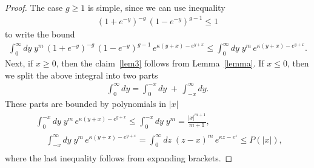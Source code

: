 \documentclass[11pt]{article}
\numberwithin{equation}{section}
\theoremstyle{plain}
\theoremstyle{definition}
\begin{document}
\begin{proof}
	The case $g \geq 1$ is simple, since we can use inequality
	\begin{align}
		(1 + e^{-y})^{- g} \, (1 - e^{-y})^{g - 1} \leq 1
	\end{align}
	to write the bound
	\begin{align}
		\int_{0}^\infty dy \; y^m  \, (1 + e^{-y})^{- g} \, (1 - e^{-y})^{g - 1} \, e^{\kappa (y + x) - e^{y + x}} \leq \int_{0}^\infty dy \; y^m  \,  e^{\kappa (y + x) - e^{y + x}}.
	\end{align}
	Next, if $x \geq 0$, then the claim~\eqref{lem3} follows from Lemma~\ref{lemma}. If $x \leq 0$, then we split the above integral into two parts
	\begin{align}
		\int_{0}^\infty dy = \int_{0}^{-x} dy \; +\, \int_{-x}^\infty dy.
	\end{align}
	These parts are bounded by polynomials in $|x|$
	\begin{align} \label{ineq3}
		\begin{aligned}
			& \int_{0}^{-x} dy \; y^m  \,  e^{\kappa (y + x) - e^{y + x}} \leq \int_{0}^{-x} dy \; y^m = \frac{ | x |^{m + 1}}{m + 1}, \\[6pt]
			& \begin{aligned}
				& \int_{-x}^\infty dy \; y^m  \, e^{\kappa (y + x) - e^{y + x}}  = \int_{0}^\infty dz \; (z - x)^m  \, e^{ \kappa z - e^{z}} \leq P(|x|),
			\end{aligned}
		\end{aligned}
	\end{align}
	where the last inequality follows from expanding brackets. 
	

\end{proof}
\end{document}
